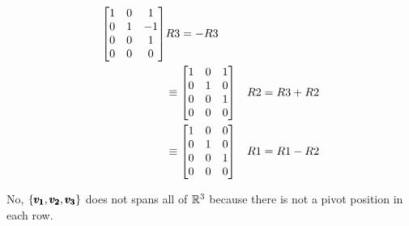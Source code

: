 \documentclass{../mathhomework}
\newenvironment{Mat}{\begin{bmatrix}}{\end{bmatrix}}
\begin{document}
\begin{problem}[1.4\#21]
\begin{solution}
\begin{align*}
            \begin{Mat}
                1 & 0 & 1 \\
                0 & 1 & -1 \\
                0 & 0 & 1 \\
                0 & 0 & 0 
            \end{Mat} & R3 = -R3 \\ & \equiv
            \begin{Mat}
                1 & 0 & 1 \\
                0 & 1 & 0 \\
                0 & 0 & 1 \\
                0 & 0 & 0 
            \end{Mat} & R2 = R3 + R2 \\ & \equiv
            \begin{Mat}
                1 & 0 & 0 \\
                0 & 1 & 0 \\
                0 & 0 & 1 \\
                0 & 0 & 0 
            \end{Mat} & R1 = R1 - R2
        \end{align*}

        No, $\{\pmb{v_1}, \pmb{v_2}, \pmb{v_3}\}$ does not spans all of $\mathbb{R}^3$ because there is not a pivot position in each row.
    \end{solution}
\end{problem}
\end{document}
